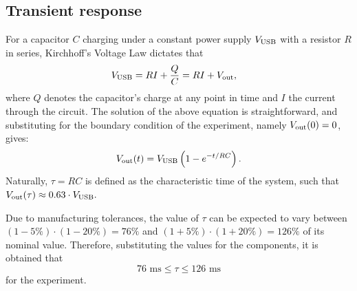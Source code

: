 \documentclass{article}
\begin{document}
\subsection{Transient response}
For a capacitor $C$ charging under a constant power supply $V_{\text{USB}}$ with a resistor $R$ in series, Kirchhoff's Voltage Law dictates that
\begin{equation*}
    \begin{split}
        V_{\text{USB}} &= RI + \frac{Q}{C} = RI + V_{\text{out}},
    \end{split}
\end{equation*}
where $Q$ denotes the capacitor's charge at any point in time and $I$ the current through the circuit. The solution of the above equation is straightforward, and substituting for the boundary condition of the experiment, namely $V_{\text{out}}(0) = 0$, gives:
\begin{equation}
    V_{\text{out}}(t) = V_{\text{USB}}\left( 1 - e^{-t/RC}\right).
    \label{eqn:charge_ideal}
\end{equation}
Naturally, $\tau = RC$ is defined as the characteristic time of the system, such that $V_{\text{out}}(\tau) \approx 0.63 \cdot V_{\text{USB}}.$
\par Due to manufacturing tolerances, the value of $\tau$ can be expected to vary between $(1-5\%)\cdot(1-20\%) = 76\%$ and $(1+5\%)\cdot(1+20\%) = 126\%$ of its nominal value. Therefore, substituting the values for the components, it is obtained that
\begin{equation}
    76\text{ ms} \le \tau \le 126 \text { ms}
    \label{eqn:tau_boundary}
\end{equation}
for the experiment.
\end{document}
